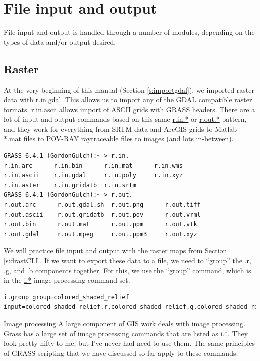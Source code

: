 \documentclass{book}
\begin{document}
\chapter{File input and output \label{s:FIO}}

File input and output is handled through a number of modules, depending on the types of data and/or output desired.

\section{Raster \label{s:FIOrast}}

At the very beginning of this manual (Section \ref{s:importgdal}), we imported raster data with \url{r.in.gdal}. This allows us to import any of the GDAL compatible raster formats. \url{r.in.ascii} allows import of ASCII grids with GRASS headers. There are a lot of input and output commands based on this same \url{r.in.*} or \url{r.out.*} pattern, and they work for everything from SRTM data and ArcGIS grids to Matlab \url{*.mat} files to POV-RAY raytraceable files to images (and lots in-between).

\begin{lstlisting}
GRASS 6.4.1 (GordonGulch):~ > r.in.
r.in.arc      r.in.bin      r.in.mat      r.in.wms      
r.in.ascii    r.in.gdal     r.in.poly     r.in.xyz      
r.in.aster    r.in.gridatb  r.in.srtm     
GRASS 6.4.1 (GordonGulch):~ > r.out.
r.out.arc      r.out.gdal.sh  r.out.png      r.out.tiff     
r.out.ascii    r.out.gridatb  r.out.pov      r.out.vrml     
r.out.bin      r.out.mat      r.out.ppm      r.out.vtk      
r.out.gdal     r.out.mpeg     r.out.ppm3     r.out.xyz      
\end{lstlisting}

We will practice file input and output with the raster maps from Section \ref{s:drastCLI}. If we want to export these data to a file, we need to ``group'' the .r, .g, and .b components together. For this, we use the ``group'' command, which is in the \url{i.*} image processing command set.

\begin{lstlisting}
i.group group=colored_shaded_relief input=colored_shaded_relief.r,colored_shaded_relief.g,colored_shaded_relief.b
\end{lstlisting}

\begin{boxx}[!ht]
\begin{bclogo}[arrondi = 0.1, logo = \bcrosevents]{Image processing}
A large component of GIS work deals with image processing. Grass has a large set of image processing commands that are listed as \url{i.*}. They look pretty nifty to me, but I've never had need to use them. The same principles of GRASS scripting that we have discussed so far apply to these commands.
\end{bclogo}
\caption{Image processing}
\end{boxx}
\end{document}
